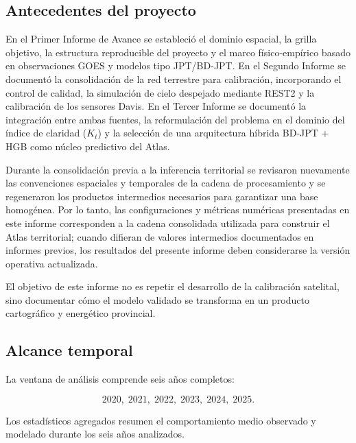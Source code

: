 \documentclass[11pt,a4paper]{article}
\begin{document}
\subsection{Antecedentes del proyecto}

En el Primer Informe de Avance se estableció el dominio espacial, la grilla objetivo, la estructura reproducible del proyecto y el marco físico-empírico basado en observaciones GOES y modelos tipo JPT/BD-JPT. En el Segundo Informe se documentó la consolidación de la red terrestre para calibración, incorporando el control de calidad, la simulación de cielo despejado mediante REST2 \cite{gueymard2008} y la calibración de los sensores Davis. En el Tercer Informe se documentó la integración entre ambas fuentes, la reformulación del problema en el dominio del índice de claridad ($K_t$) y la selección de una arquitectura híbrida BD-JPT + HGB como núcleo predictivo del Atlas.

Durante la consolidación previa a la inferencia territorial se revisaron nuevamente las convenciones espaciales y temporales de la cadena de procesamiento y se regeneraron los productos intermedios necesarios para garantizar una base homogénea. Por lo tanto, las configuraciones y métricas numéricas presentadas en este informe corresponden a la cadena consolidada utilizada para construir el Atlas territorial; cuando difieran de valores intermedios documentados en informes previos, los resultados del presente informe deben considerarse la versión operativa actualizada.

El objetivo de este informe no es repetir el desarrollo de la calibración satelital, sino documentar cómo el modelo validado se transforma en un producto cartográfico y energético provincial.

\subsection{Alcance temporal}

La ventana de análisis comprende seis años completos:

\[
2020,\;2021,\;2022,\;2023,\;2024,\;2025.
\]

Los estadísticos agregados resumen el comportamiento medio observado y modelado durante los seis años analizados.
\end{document}
